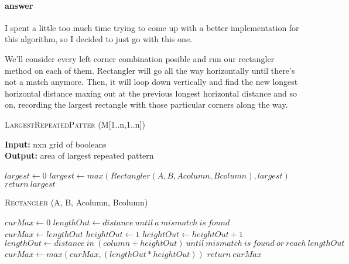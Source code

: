 \documentclass{article}
\begin{document}
\paragraph{answer}

I spent a little too much time trying to come up with a better implementation for this algorithm,
so I decided to just go with this one.

We'll consider every left corner combination posible and run our rectangler method on each of them.
Rectangler will go all the way horizontally until there's not a match anymore. Then, it will loop down vertically and find the new longest horizontal distance maxing out at the previous longest horizontal distance and so on, recording the largest rectangle with those particular corners along the way.

\begin{algorithm} \caption{\textsc{LargestRepeatedPatter} (M[1..n,1..n])}\label{alg:seb}
    {\bf Input:} nxn grid of booleans\\
    {\bf Output:} area of largest repeated pattern
    \begin{algorithmic}[1]
        \State$largest \gets 0$
                            \State$largest \gets max(Rectangler(A, B, Acolumn, Bcolumn), largest)$
                        \EndIf{}
                    \EndFor{}
                \EndFor{}
            \EndFor{}
        \EndFor{}
        \State$return\ largest$
    \end{algorithmic}
\end{algorithm}

\begin{algorithm} \caption{\textsc{Rectangler} (A, B, Acolumn, Bcolumn)}\label{alg:seb}
    \begin{algorithmic}[1]
        \State$curMax \gets 0$
        \State$lengthOut \gets distance\ until\ a\ mismatch\ is\ found$
        \State$curMax \gets lengthOut$
        \State$heightOut \gets 1$
            \State$heightOut \gets heightOut + 1$
            \State$lengthOut \gets distance\ in\ (column + heightOut)\ until\ mismatch\ is\ found\ or\ reach\ lengthOut$
            \State$curMax \gets max(curMax, (lengthOut * heightOut))$
        \EndWhile{}
        \State$return\ curMax$
    \end{algorithmic}
\end{algorithm}
\end{document}
